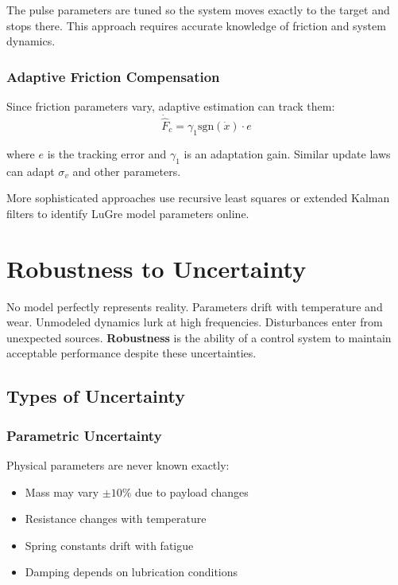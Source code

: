 The pulse parameters are tuned so the system moves exactly to the target and stops there. This approach requires accurate knowledge of friction and system dynamics.

\subsubsection{Adaptive Friction Compensation}

Since friction parameters vary, adaptive estimation can track them:
\begin{equation}
\dot{\hat{F}}_c = \gamma_1 \text{sgn}(\dot{x}) \cdot e
\end{equation}

where $e$ is the tracking error and $\gamma_1$ is an adaptation gain. Similar update laws can adapt $\sigma_v$ and other parameters.

More sophisticated approaches use recursive least squares or extended Kalman filters to identify LuGre model parameters online.

\section{Robustness to Uncertainty}
\label{sec:robustness}

No model perfectly represents reality. Parameters drift with temperature and wear. Unmodeled dynamics lurk at high frequencies. Disturbances enter from unexpected sources. \textbf{Robustness} is the ability of a control system to maintain acceptable performance despite these uncertainties.

\subsection{Types of Uncertainty}

\subsubsection{Parametric Uncertainty}

Physical parameters are never known exactly:
\begin{itemize}
    \item Mass may vary $\pm 10\%$ due to payload changes
    \item Resistance changes with temperature
    \item Spring constants drift with fatigue
    \item Damping depends on lubrication conditions
\end{itemize}


